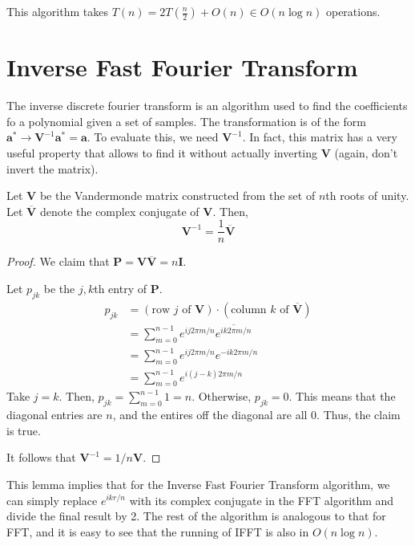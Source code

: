 This algorithm takes $T(n) = 2T\left( \frac{n}{2} \right) + O(n) \in O(n \log n)$ operations.

\section{Inverse Fast Fourier Transform} 

The inverse discrete fourier transform is an algorithm used to find the coefficients fo a polynomial given a set of samples. The transformation is of the form $\mathbf{a}^* \to \mathbf{V}^{-1}\mathbf{a}^* = \mathbf{a}$. To evaluate this, we need $\mathbf{V}^{-1}$. In fact, this matrix has a very useful property that allows to find it without actually inverting $\mathbf{V}$ (again, don't invert the matrix).

\begin{lemma}
    Let $\mathbf{V}$ be the Vandermonde matrix constructed from the set of $n$th roots of unity. Let $\overline{\mathbf{V}}$ denote the complex conjugate of $\mathbf{V}$. Then,
    $$
    \mathbf{V}^{-1} = \frac{1}{n}\overline{\mathbf{V}}
    $$
\end{lemma}

\begin{proof}
    We claim that $\mathbf{P} = \mathbf{V}\overline{\mathbf{V}} = n \mathbf{I}$.

    Let $p_{jk}$ be the $j,k$th entry of $\mathbf{P}$.
    $$
    \begin{aligned}
        p_{jk} &= (\text{row $j$ of $\mathbf{V}$}) \cdot (\text{column $k$ of $\overline{\mathbf{V}}$}) \\
        &= \sum_{m=0}^{n-1} e^{ij2\pi m/n} \overline{e^{ik2\pi m/n}} \\
        &= \sum_{m=0}^{n-1} e^{ij2\pi m/n} e^{-ik2\pi m/n} \\
        &= \sum_{m=0}^{n-1} e^{i(j-k)2\pi m/n}
    \end{aligned}
    $$
    Take $j=k$. Then, $p_{jk} = \sum_{m=0}^{n-1} 1 = n$. Otherwise, $p_{jk} = 0$. This means that the diagonal entries are $n$, and the entires off the diagonal are all 0. Thus, the claim is true.

    It follows that $\mathbf{V}^{-1} = 1/n \mathbf{V}$.
\end{proof}

This lemma implies that for the Inverse Fast Fourier Transform algorithm, we can simply replace $e^{ikr/n}$ with its complex conjugate in the FFT algorithm and divide the final result by 2. The rest of the algorithm is analogous to that for FFT, and it is easy to see that the running of IFFT is also in $O(n \log n)$.

